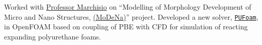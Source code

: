 \documentclass[10pt,a4]{article}
\newcommand{\quotes}[1]{``#1''}
\begin{document}
\begin{small}
\begin{list}{}{}
\item Worked with \href{http://bit.ly/2CYF9sp}{Professor Marchisio} on \quotes{Modelling of Morphology Development of Micro and Nano Structures, \href{https://github.com/karimimp/MoDeNa}{(MoDeNa)}} project. Developed a new solver, \href{http://www.sciencedirect.com/science/article/pii/S0010465517300978}{\texttt{PUFoam}}, in OpenFOAM based on coupling of PBE with CFD for simulation of reacting expanding polyurethane foams.
\end{list}


\end{small}
\end{document}
